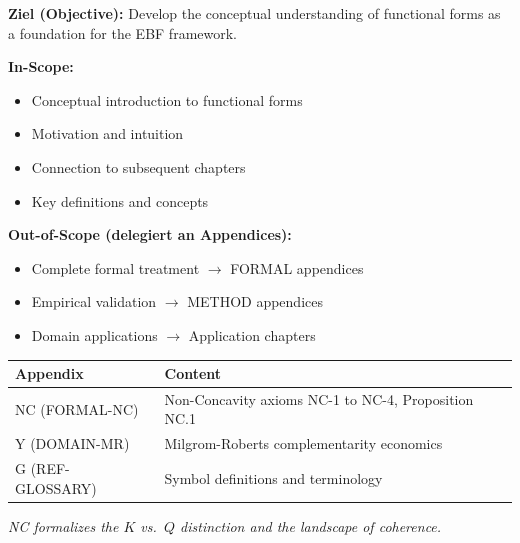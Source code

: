 \begin{tcolorbox}[
    colback=purple!5!white,
    colframe=purple!75!black,
    title={\textbf{Chapter Scope: Ziel / In-Scope / Out-of-Scope}},
    fonttitle=\bfseries
]

\textbf{Ziel (Objective):}
Develop the conceptual understanding of functional forms as a foundation for the EBF framework.

\vspace{0.3cm}
\textbf{In-Scope:}
\begin{itemize}[nosep]
    \item Conceptual introduction to functional forms
    \item Motivation and intuition
    \item Connection to subsequent chapters
    \item Key definitions and concepts
\end{itemize}

\vspace{0.3cm}
\textbf{Out-of-Scope (delegiert an Appendices):}
\begin{itemize}[nosep]
    \item Complete formal treatment $\rightarrow$ FORMAL appendices
    \item Empirical validation $\rightarrow$ METHOD appendices
    \item Domain applications $\rightarrow$ Application chapters
\end{itemize}

\end{tcolorbox}

\begin{tcolorbox}[
    colback=yellow!10!white,
    colframe=orange!75!black,
    title={\textbf{Appendix References for This Chapter}},
    fonttitle=\bfseries
]
\small
\begin{tabular}{@{}lp{8cm}@{}}
\textbf{Appendix} & \textbf{Content} \\
\midrule
NC (FORMAL-NC) & Non-Concavity axioms NC-1 to NC-4, Proposition NC.1 \\
Y (DOMAIN-MR) & Milgrom-Roberts complementarity economics \\
G (REF-GLOSSARY) & Symbol definitions and terminology \\
\end{tabular}

\medskip
\textit{NC formalizes the $K$ vs.\ $Q$ distinction and the landscape of coherence.}
\end{tcolorbox}

